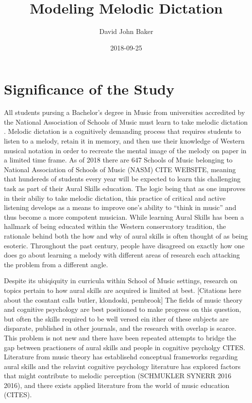 \documentclass[]{book}
\title{Modeling Melodic Dictation}
\author{David John Baker}
\date{2018-09-25}
\theoremstyle{definition}
\theoremstyle{definition}
\theoremstyle{definition}
\theoremstyle{remark}
\begin{document}
\maketitle

{
\setcounter{tocdepth}{1}
\tableofcontents
}
\hypertarget{significance-of-the-study}{%
\chapter{Significance of the Study}\label{significance-of-the-study}}

All students pursing a Bachelor's degree in Music from universities
accredited by the National Association of Schools of Music must learn to
take melodic dictation \citep[ Section
VIII.6.B.2.A]{NationalAssociationSchools2018}. Melodic dictation is a
cognitively demanding process that requires students to listen to a
melody, retain it in memory, and then use their knowledge of Western
musical notation in order to recreate the mental image of the melody on
paper in a limited time frame. As of 2018 there are 647 Schools of Music
belonging to National Association of Schools of Music (NASM) CITE
WEBSITE, meaning that hundereds of students every year will be expected
to learn this challenging task as part of their Aural Skills education.
The logic being that as one improves in their abiliy to take melodic
dictation, this practice of critical and active listening develops as a
means to improve one's ability to ``think in music'' and thus become a
more compotent musician. While learning Aural Skills has been a hallmark
of being educated within the Western conservatory tradition, the
rationale behind both the how and why of aural skills is often thought
of as being esoteric. Throughout the past century, people have disagreed
on exactly how one does go about learning a melody with different areas
of research each attacking the problem from a different angle.

Despite its ubiqiquity in curricula within School of Music settings,
research on topics pertain to how aural skills are acquired is limited
at best. {[}Citations here about the cosntant calls butler, klondoski,
pembrook{]} The fields of music theory and cognitive psychology are best
positioned to make progress on this question, but often the skills
required to be well versed ein ither of these subjects are disparate,
published in other journals, and the research with overlap is scarce.
This problem is not new and there have been repeated attempts to bridge
the gap between practioners of aural skills and people in cognitive
psycholgy CITES. Literature from music theory has establisehd conceptual
frameworks regarding aural skills
\citet{karpinskiAuralSkillsAcquisition2000} and the relavint cognitive
psychology literature has explored factors that might contribute to
melodic perception (SCHMUKLER SYNERR 2016 2016), and there exists
applied literature from the world of music education (CITES).
\end{document}
